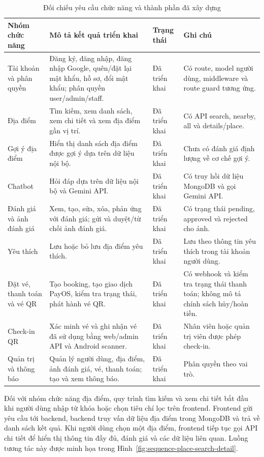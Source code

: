 ﻿\documentclass[../DoAn.tex]{subfiles}
\begin{document}
\begin{table}[H]
\centering
\caption{Đối chiếu yêu cầu chức năng và thành phần đã xây dựng}
\label{tab:implementation-results}
\scriptsize
\renewcommand{\arraystretch}{1.15}
\setlength{\tabcolsep}{3pt}
\begin{tabularx}{\textwidth}{|L{2.8cm}|Y|L{2.0cm}|Y|}
\hline
\textbf{Nhóm chức năng} & \textbf{Mô tả kết quả triển khai} & \textbf{Trạng thái} & \textbf{Ghi chú} \\
\hline
Tài khoản và phân quyền & Đăng ký, đăng nhập, đăng nhập Google, quên/đặt lại mật khẩu, hồ sơ, đổi mật khẩu; phân quyền user/admin/staff. & Đã triển khai & Có route, model người dùng, middleware và route guard tương ứng. \\
\hline
Địa điểm & Tìm kiếm, xem danh sách, xem chi tiết và xem địa điểm gần vị trí. & Đã triển khai & Có API search, nearby, all và details/place. \\
\hline
Gợi ý địa điểm & Hiển thị danh sách địa điểm được gợi ý dựa trên dữ liệu nội bộ. & Đã triển khai & Chưa có đánh giá định lượng về cơ chế gợi ý. \\
\hline
Chatbot & Hỏi đáp dựa trên dữ liệu nội bộ và Gemini API. & Đã triển khai & Có truy hồi dữ liệu MongoDB và gọi Gemini API. \\
\hline
Đánh giá và ảnh đánh giá & Xem, tạo, sửa, xóa, phản ứng với đánh giá; gửi và duyệt/từ chối ảnh đánh giá. & Đã triển khai & Có trạng thái pending, approved và rejected cho ảnh. \\
\hline
Yêu thích & Lưu hoặc bỏ lưu địa điểm yêu thích. & Đã triển khai & Lưu theo thông tin yêu thích trong tài khoản người dùng. \\
\hline
Đặt vé, thanh toán và vé QR & Tạo booking, tạo giao dịch PayOS, kiểm tra trạng thái, phát hành vé QR. & Đã triển khai & Có webhook và kiểm tra trạng thái thanh toán; không mô tả chính sách hủy/hoàn tiền. \\
\hline
Check-in QR & Xác minh vé và ghi nhận vé đã sử dụng bằng web/admin API và Android scanner. & Đã triển khai & Nhân viên hoặc quản trị viên được phép check-in. \\
\hline
Quản trị và thông báo & Quản lý người dùng, địa điểm, ảnh đánh giá, vé, thanh toán; tạo và xem thông báo. & Đã triển khai & Phân quyền theo vai trò. \\
\hline
\end{tabularx}
\end{table}

Đối với nhóm chức năng địa điểm, quy trình tìm kiếm và xem chi tiết bắt đầu khi người dùng nhập từ khóa hoặc chọn tiêu chí lọc trên frontend. Frontend gửi yêu cầu tới backend, backend truy vấn dữ liệu địa điểm trong MongoDB và trả về danh sách kết quả. Khi người dùng chọn một địa điểm, frontend tiếp tục gọi API chi tiết để hiển thị thông tin đầy đủ, đánh giá và các dữ liệu liên quan. Luồng tương tác này được minh họa trong Hình~\ref{fig:sequence-place-search-detail}.
\end{document}
